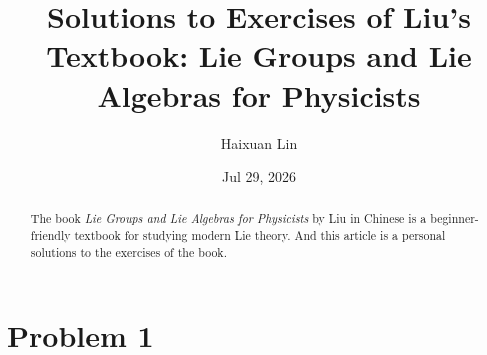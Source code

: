 \documentclass[11pt]{amsart}
\title{Solutions to Exercises of Liu's Textbook: Lie Groups and Lie Algebras for Physicists}
\author{Haixuan Lin}
\date{Jul 29, 2026}
\theoremstyle{definition}
\theoremstyle{remark}
\begin{document}
\begin{abstract}
  The book \textit{Lie Groups and Lie Algebras for Physicists} \cite{Liu2022LieGroups} by Liu in Chinese is a beginner-friendly textbook for studying modern Lie theory. And this article is a personal solutions to the exercises of the book.
\end{abstract}

\maketitle




\section{Problem 1}



\nocite{*}


\end{document}
